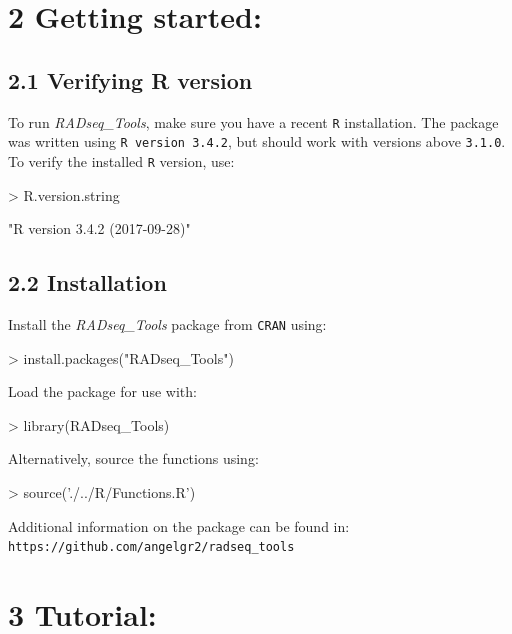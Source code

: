 \documentclass{article}
\begin{document}
\section*{2 Getting started:}
\subsection*{2.1  Verifying R version}
To run \emph{RADseq\_Tools}, make sure you have a recent \texttt{R} installation. The package was written using \texttt{R version 3.4.2}, but should work with versions above \texttt{3.1.0}. To verify the installed \texttt{R} version, use:
\begin{Schunk}
\begin{Sinput}
> R.version.string
\end{Sinput}
\begin{Soutput}
[1] "R version 3.4.2 (2017-09-28)"
\end{Soutput}
\end{Schunk}

\subsection*{2.2  Installation}
Install the \emph{RADseq\_Tools} package from \texttt{CRAN} using:

\begin{Schunk}
\begin{Sinput}
> install.packages("RADseq_Tools")
\end{Sinput}
\end{Schunk}

Load the package for use with:
\begin{Schunk}
\begin{Sinput}
> library(RADseq_Tools)
\end{Sinput}
\end{Schunk}

Alternatively, source the functions using:
\begin{Schunk}
\begin{Sinput}
> source('./../R/Functions.R')
\end{Sinput}
\end{Schunk}

Additional information on the package can be found in:\\ \texttt{https://github.com/angelgr2/radseq\_tools}


\section*{3 Tutorial:}
\end{document}
